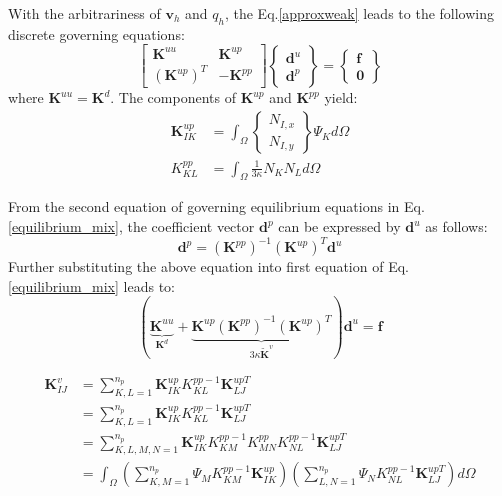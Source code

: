 With the arbitrariness of $\boldsymbol v_h$ and $q_h$, the Eq.\eqref{approxweak} leads to the following discrete governing equations:
\begin{equation}\label{equilibrium_mix}
    \begin{bmatrix}
        \boldsymbol K^{uu} & \boldsymbol K^{up} \\ (\boldsymbol K^{up})^T & -\boldsymbol K^{pp}
    \end{bmatrix}
    \begin{Bmatrix}
        \boldsymbol d^u \\ \boldsymbol d^p 
    \end{Bmatrix} =
    \begin{Bmatrix}
        \boldsymbol f \\ \boldsymbol 0 
    \end{Bmatrix}
\end{equation}
where $\boldsymbol K^{uu} = \boldsymbol K^d$. The components of $\boldsymbol K^{up}$ and $\boldsymbol K^{pp}$ yield:
\begin{align}
    \boldsymbol K^{up}_{IK} &= \int_{\Omega} 
    \begin{Bmatrix}
    N_{I,x} \\ N_{I,y}
    \end{Bmatrix} \Psi_K d\Omega \\
    K^{pp}_{KL} &= \int_\Omega\frac{1}{3\kappa} N_K N_L d\Omega
\end{align}

From the second equation of governing equilibrium equations in Eq. \eqref{equilibrium_mix}, the coefficient vector $\boldsymbol d^p$ can be expressed by $\boldsymbol d^u$ as follows:
\begin{equation}
    \boldsymbol d^p = (\boldsymbol K^{pp})^{-1} (\boldsymbol K^{up})^T \boldsymbol d^u
\end{equation}
Further substituting the above equation into first equation of Eq. \eqref{equilibrium_mix} leads to:
\begin{equation}
    (\underbrace{\boldsymbol K^{uu}}_{\boldsymbol K^d} + \underbrace{\boldsymbol K^{up}(\boldsymbol K^{pp})^{-1}(\boldsymbol K^{up})^{T}}_{3\kappa \tilde{\boldsymbol K}^v}) \boldsymbol d^u = \boldsymbol f
\end{equation}


\begin{equation}
\begin{split}
    \boldsymbol K^v_{IJ} &= \sum_{K,L=1}^{n_p}\boldsymbol K^{up}_{IK} K^{pp-1}_{KL} \boldsymbol K^{upT}_{LJ} \\
    &= \sum_{K,L=1}^{n_p}\boldsymbol K^{up}_{IK} K^{pp-1}_{KL} \boldsymbol K^{upT}_{LJ} \\
    &= \sum_{K,L,M,N=1}^{n_p} \boldsymbol K^{up}_{IK} K^{pp-1}_{KM}  K^{pp}_{MN} K^{pp-1}_{NL} \boldsymbol K^{upT}_{LJ} \\
    &= \int_\Omega (\sum_{K,M=1}^{n_p} \Psi_M K^{pp-1}_{KM} \boldsymbol K^{up}_{IK}) (\sum_{L,N=1}^{n_p}\Psi_N K^{pp-1}_{NL} \boldsymbol K^{upT}_{LJ}) d\Omega \\
\end{split}
\end{equation}


